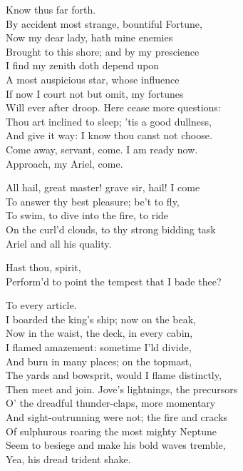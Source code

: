 \begin{verse_speech}[Prospero] 
Know thus far forth.\\
By accident most strange, bountiful Fortune,\\
Now my dear lady, hath mine enemies\\
Brought to this shore; and by my prescience\\
I find my zenith doth depend upon\\
A most auspicious star, whose influence\\
If now I court not but omit, my fortunes\\
Will ever after droop. Here cease more questions:\\
Thou art inclined to sleep; 'tis a good dullness,\\
And give it way: I know thou canst not choose.\\
Come away, servant, come. I am ready now.\\
Approach, my Ariel, come.\\
\end{verse_speech}

\begin{verse_speech}[Ariel] 
All hail, great master! grave sir, hail! I come\\
To answer thy best pleasure; be't to fly,\\
To swim, to dive into the fire, to ride\\
On the curl'd clouds, to thy strong bidding task\\
Ariel and all his quality.
\end{verse_speech}

\begin{verse_speech}[Prospero] 
Hast thou, spirit,\\
Perform'd to point the tempest that I bade thee?
\end{verse_speech}

\begin{verse_speech}[Ariel] 
To every article.\\
I boarded the king's ship; now on the beak,\\
Now in the waist, the deck, in every cabin,\\
I flamed amazement: sometime I'ld divide,\\
And burn in many places; on the topmast,\\
The yards and bowsprit, would I flame distinctly,\\
Then meet and join. Jove's lightnings, the precursors\\
O' the dreadful thunder-claps, more momentary\\
And sight-outrunning were not; the fire and cracks\\
Of sulphurous roaring the most mighty Neptune\\
Seem to besiege and make his bold waves tremble,\\
Yea, his dread trident shake.
\end{verse_speech}

